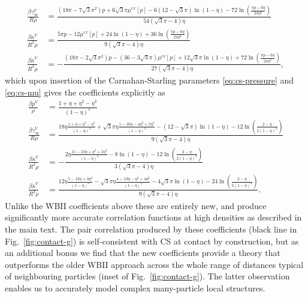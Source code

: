 \documentclass[11pt]{report}
\begin{document}
\begin{subequations}
  \begin{align}
    \frac{\beta \gamma_\infty^{V}}{R\rho} &=
    \frac{ (18\pi - 7\sqrt{3} \pi^2) p + 6\sqrt{3}\pi \mu^{ex}[p]
      - 6(12 - \sqrt{3}\pi) \ln{(1-\eta)}
      - 72\ln{\left( \frac{\pi p - 6\eta}{24\eta^2} \right)} }
    {54(\sqrt{3}\pi - 4) \eta}
    \label{eq:virial-gamma}
    \\
    \frac{\beta \kappa^{V}}{R^2\rho} &=
    \frac{ 5\pi p - 12 \mu^{ex}[p] + 24 \ln{(1-\eta)}
      + 36\ln{\left( \frac{\pi p - 6\eta}{24\eta^2} \right)} }
    {9(\sqrt{3}\pi - 4) \eta}
    \\
    \frac{\beta \overline{\kappa}^{V}}{R^3\rho} &=
    - \frac{
      (18\pi - 2\sqrt{3} \pi^2) p - (36 - 3\sqrt{3}\pi) \mu^{ex}[p] + 12\sqrt{3}\pi \ln{(1-\eta)}
      + 72\ln{\left( \frac{\pi p - 6\eta}{24\eta^2} \right)} }
    {27(\sqrt{3}\pi - 4) \eta},
  \end{align}
\end{subequations}
which upon insertion of the Carnahan-Starling parameters \eqref{eq:cs-pressure} and \eqref{eq:cs-mu} gives the coefficients explicitly as
\begin{subequations}
  \begin{align}
    \frac{\beta p^{V}}{\rho} &=
    \frac{1 + \eta + \eta^2 - \eta^3}{(1-\eta)^3} \\
    \frac{\beta \gamma_\infty^{V}}{R\rho} &=
    \frac{ 18\eta \frac{1 + \eta + \eta^2 - \eta^3}{(1-\eta)^3}
      + \sqrt{3}\pi\eta \frac{1 - 16\eta - 4\eta^2 + 7\eta^3}{(1-\eta)^3}
      - (12 - \sqrt{3}\pi) \ln{(1-\eta)}
      - 12\ln{\left( \frac{2 - \eta}{2(1-\eta)^3} \right)} }
    {9(\sqrt{3}\pi - 4) \eta} \\
    \frac{\beta \kappa^{V}}{R^2\rho} &= -
    \frac{ 2\eta \frac{11 - 23\eta + \eta^2 + 5\eta^3}{(1-\eta)^3}
      - 8 \ln{(1-\eta)}
      - 12\ln{\left( \frac{2 - \eta}{2(1-\eta)^3} \right)} }
    {3(\sqrt{3}\pi - 4) \eta} \\
    \frac{\beta \overline{\kappa}^{V}}{R^3\rho} &=
    \frac{ 12\eta \frac{5 - 12\eta + 3\eta^3}{(1-\eta)^3}
      - \sqrt{3}\pi\eta \frac{4 - 13\eta - \eta^2 + 4\eta^3}{(1-\eta)^3}
      - 4\sqrt{3}\pi \ln{(1-\eta)}
      - 24\ln{\left( \frac{2 - \eta}{2(1-\eta)^3} \right)} }
    {9(\sqrt{3}\pi - 4) \eta}.
  \end{align}
\end{subequations}
Unlike the WBII coefficients above these are entirely new, and produce significantly more accurate correlation functions at high densities as described in the main text.
The pair correlation produced by these coefficients (black line in Fig.\ \ref{fig:contact-g}) is self-consistent with CS at contact by construction, but as an additional bonus we find that the new coefficients provide a theory that outperforms the older WBII approach across the whole range of distances typical of neighbouring particles (inset of Fig.\ \ref{fig:contact-g}).
The latter observation enables us to accurately model complex many-particle local structures.
\end{document}
